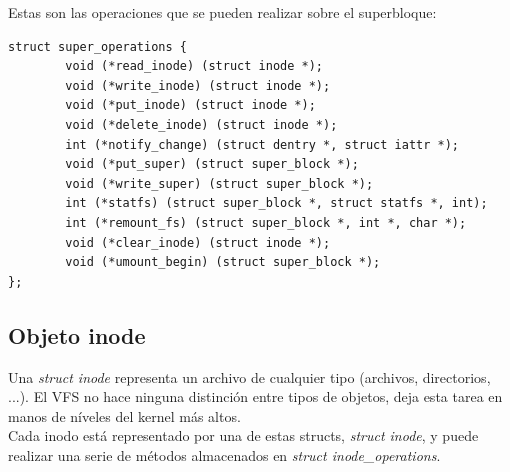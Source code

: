\documentclass[11pt,a4paper]{article}
\newcommand\tab[1][1cm]{\hspace*{#1}}
\begin{document}
\tab Estas son las operaciones que se pueden realizar sobre el superbloque: 

\begin{verbatim}
struct super_operations {
        void (*read_inode) (struct inode *);
        void (*write_inode) (struct inode *);
        void (*put_inode) (struct inode *);
        void (*delete_inode) (struct inode *);
        int (*notify_change) (struct dentry *, struct iattr *);
        void (*put_super) (struct super_block *);
        void (*write_super) (struct super_block *);
        int (*statfs) (struct super_block *, struct statfs *, int);
        int (*remount_fs) (struct super_block *, int *, char *);
        void (*clear_inode) (struct inode *);
        void (*umount_begin) (struct super_block *);
};
\end{verbatim}

\subsection {Objeto inode} 

\tab Una \emph{struct inode} representa un archivo de cualquier tipo (archivos, directorios, ...). El VFS no hace ninguna distinción entre tipos de objetos, deja esta tarea en manos de níveles del kernel más altos. \\

\tab Cada inodo está representado por una de estas structs, \emph{struct inode}, y puede realizar una serie de métodos almacenados en \emph{struct inode\_operations}. \cite{stalling} \\
\end{document}
